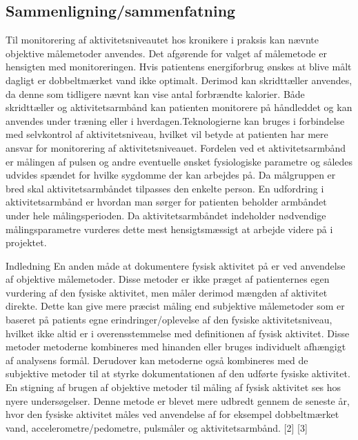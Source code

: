 \subsection{Sammenligning/sammenfatning}
Til monitorering af aktivitetsniveautet hos kronikere i praksis kan nævnte objektive målemetoder anvendes. Det afgørende for valget af målemetode er hensigten med monitoreringen. Hvis patientens energiforbrug ønskes at blive målt dagligt er dobbeltmærket vand ikke optimalt. Derimod kan skridttæller anvendes, da denne som tidligere nævnt kan vise antal forbrændte kalorier. Både skridttæller og aktivitetsarmbånd kan patienten monitorere på håndleddet og kan anvendes under træning eller i hverdagen.Teknologierne kan bruges i forbindelse med selvkontrol af aktivitetsniveau, hvilket vil betyde at patienten har mere ansvar for monitorering af aktivitetsniveauet. Fordelen ved et aktivitetsarmbånd er målingen af pulsen og andre eventuelle ønsket fysiologiske parametre og således udvides spændet for hvilke sygdomme der kan arbejdes på.  Da målgruppen er bred skal aktivitetsarmbåndet tilpasses den enkelte person. En udfordring i aktivitetsarmbånd er hvordan man sørger for patienten beholder armbåndet under hele målingsperioden. Da aktivitetsarmbåndet indeholder nødvendige målingsparametre vurderes dette mest hensigtsmæssigt at arbejde videre på i projektet. 


Indledning
En anden måde at dokumentere fysisk aktivitet på er ved anvendelse af objektive målemetoder. Disse metoder er ikke præget af patienternes egen vurdering af den fysiske aktivitet, men måler derimod mængden af aktivitet direkte. Dette kan give mere præcist måling end subjektive målemetoder som er baseret på patients egne erindringer/oplevelse af den fysiske aktivitetsniveau, hvilket ikke altid er i overensstemmelse med definitionen af fysisk aktivitet.   Disse metoder metoderne kombineres med hinanden eller bruges individuelt afhængigt af analysens formål. Derudover kan metoderne også kombineres med de subjektive metoder til at styrke dokumentationen af den udførte fysiske aktivitet. En stigning af brugen af objektive metoder til måling af fysisk aktivitet ses hos nyere undersøgelser. Denne metode er blevet mere udbredt gennem de seneste år, hvor den fysiske aktivitet måles ved anvendelse af for eksempel dobbeltmærket vand, accelerometre/pedometre, pulsmåler og aktivitetsarmbånd. [2] [3] 




